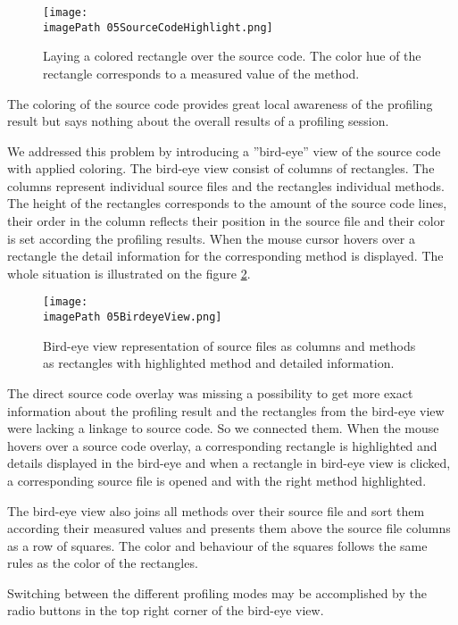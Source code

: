 \begin{figure}
	\centering
		\texttt{[image: \\imagePath 05SourceCodeHighlight.png]}
		\caption{Laying a colored rectangle over the source code. The color hue of the rectangle corresponds to a measured value of the method. }
	\label{fig:05SourceCodeHighlight}
\end{figure}

The coloring of the source code provides great local awareness of the profiling result but says nothing about the overall results of a profiling session. 

We addressed this problem by introducing a ''bird-eye'' view of the source code with applied coloring. The bird-eye view consist of columns of rectangles. The columns represent individual source files and the rectangles individual methods. The height of the rectangles corresponds to the amount of the source code lines, their order in the column reflects their position in the source file and their color is set according the profiling results.
When the mouse cursor hovers over a rectangle the detail information for the corresponding method is displayed. The whole situation is illustrated on the figure \ref{fig:05BirdeyeView}.

\begin{figure}
	\centering
		\texttt{[image: \\imagePath 05BirdeyeView.png]}
		\caption{Bird-eye view representation of source files as columns and methods as rectangles with highlighted method and detailed information. }
	\label{fig:05BirdeyeView}
\end{figure}

The direct source code overlay was missing a possibility to get more exact information about the profiling result and the rectangles from the bird-eye view were lacking a linkage to source code. So we connected them. When the mouse hovers over a source code overlay, a corresponding rectangle is highlighted and details displayed in the bird-eye and when a rectangle in bird-eye view is clicked, a corresponding source file is opened and with the right method highlighted. 

The bird-eye view also joins all methods over their source file and sort them according their measured values and presents them above the source file columns as a row of squares. The color and behaviour of the squares follows the same rules as the color of the rectangles.

Switching between the different profiling modes may be accomplished by the radio buttons in the top right corner of the bird-eye view.

